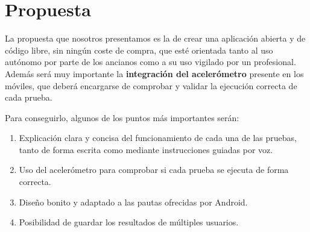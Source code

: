 \section{Propuesta}

La propuesta que nosotros presentamos es la de crear una aplicación abierta y de código libre, sin ningún coste de compra, que esté orientada tanto al uso autónomo por parte de los ancianos como a su uso vigilado por un profesional. Además será muy importante la \textbf{integración del acelerómetro} presente en los móviles, que deberá encargarse de comprobar y validar la ejecución correcta de cada prueba.

Para conseguirlo, algunos de los puntos más importantes serán:
\begin{enumerate}
  \item Explicación clara y concisa del funcionamiento de cada una de las pruebas, tanto de forma escrita como mediante instrucciones guiadas por voz.
  \item Uso del acelerómetro para comprobar si cada prueba se ejecuta de forma correcta.
  \item Diseño bonito y adaptado a las pautas ofrecidas por Android.
  \item Posibilidad de guardar los resultados de múltiples usuarios.
\end{enumerate}